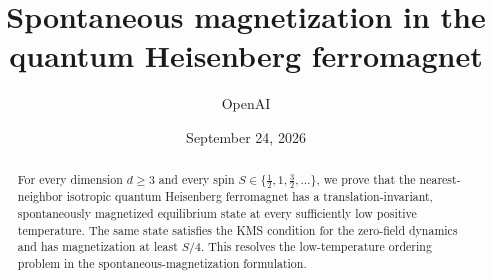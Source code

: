 \documentclass[11pt]{article}
\title{Spontaneous magnetization in the quantum Heisenberg ferromagnet}
\author{OpenAI}
\date{September 24, 2026}
\newcommand{\1}{\mathbf 1}
\theoremstyle{definition}
\theoremstyle{remark}
\numberwithin{equation}{section}
\begin{document}
\maketitle
\begin{abstract}
For every dimension $d\geq3$ and every spin $S\in\{\frac12,1,\frac32,\ldots\}$,
we prove that the nearest-neighbor isotropic quantum Heisenberg ferromagnet
has a translation-invariant, spontaneously magnetized equilibrium state
at every sufficiently low positive temperature.
The same state satisfies the KMS condition for the zero-field dynamics
and has magnetization at least $S/4$.
This resolves the low-temperature ordering problem in the
spontaneous-magnetization formulation.
\end{abstract}
\tableofcontents










\end{document}
